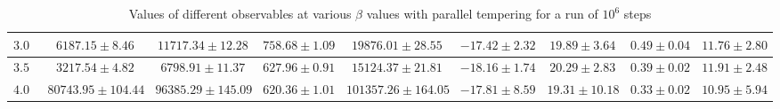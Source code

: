 \begin{sidewaystable}[t!]
\begin{tabular}{|c|c|c|c|c|c|c|c|c|}
            \hline
            $3.00$ & $6187.15 \pm 8.46$ & $11717.34 \pm 12.28$ & $758.68 \pm 1.09$ & $19876.01 \pm 28.55$ & $-17.42 \pm 2.32$ & $19.89 \pm 3.64$ & $0.49 \pm 0.04$ & $11.76 \pm 2.80$ \\
            \hline
            $3.50$ & $3217.54 \pm 4.82$ & $6798.91 \pm 11.37$ & $627.96 \pm 0.91$ & $15124.37 \pm 21.81$ & $-18.16 \pm 1.74$ & $20.29 \pm 2.83$ & $0.39 \pm 0.02$ & $11.91 \pm 2.48$ \\
            \hline
            $4.00$ & $80743.95 \pm 104.44$ & $96385.29 \pm 145.09$ & $620.36 \pm 1.01$ & $101357.26 \pm 164.05$ & $-17.81 \pm 8.59$ & $19.31 \pm 10.18$ & $0.33 \pm 0.02$ & $10.95 \pm 5.94$ \\            
            \hline
        \end{tabular}
            \caption{Values of different observables at various $\beta$ values with parallel tempering for a run of $10 ^6$ steps}
        \label{mmc}
        \end{sidewaystable}